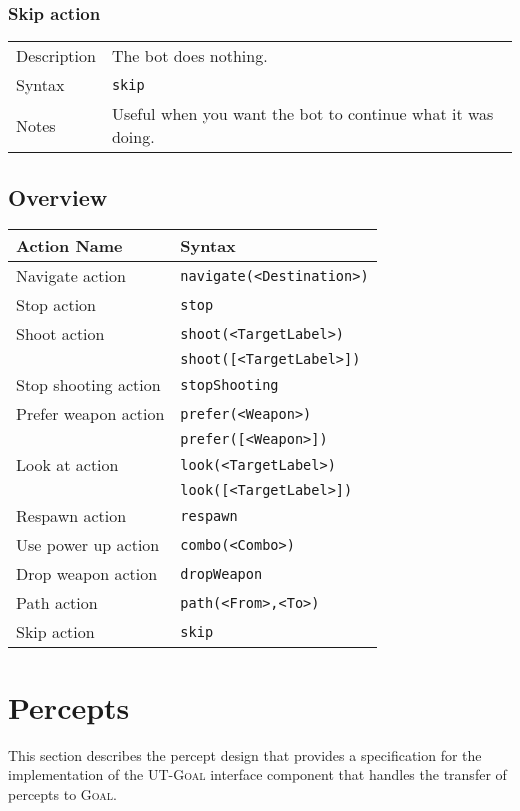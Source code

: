 \documentclass[11pt,a4paper]{article}
\newcommand{\Goal}{\textsc{Goal}}
\begin{document}
\subsubsection*{Skip action} 	
\begin{small}
\begin{tabular}{p{2cm}p{9cm}}
Description & The bot does nothing.\\
Syntax & \verb|skip|\\
Notes & 
		Useful when you want the bot to continue what it was doing.\\
\end{tabular}
\end{small}

\subsection{Overview}
\label{sec:actionsoverview}

\begin{small}
\begin{tabular}{|p{4cm}|p{7cm}|}	
	\hline
Action Name			 & Syntax\\
\hline\hline
Navigate action 		& \verb|navigate(<Destination>)|\\
Stop action			& \verb|stop| \\
Shoot action 			& \verb|shoot(<TargetLabel>)| \\
				& \verb|shoot([<TargetLabel>])| \\
Stop shooting action 	& \verb|stopShooting| \\
Prefer weapon action 	& \verb|prefer(<Weapon>)|\\
				& \verb|prefer([<Weapon>])|\\
Look at action		& \verb|look(<TargetLabel>)|\\
				& \verb|look([<TargetLabel>])|\\
Respawn action		& \verb|respawn|\\
Use power up action	& \verb|combo(<Combo>)| \\
Drop weapon action 	& \verb|dropWeapon| \\
Path action			& \verb|path(<From>,<To>)|\\
Skip action			& \verb|skip|\\
\hline
\end{tabular}
\end{small}

\section{Percepts}
\label{sec:percepts}
This section describes the percept design that provides a specification for the implementation of the UT-{\Goal} interface component that handles the transfer of percepts to {\Goal}. 
\end{document}

